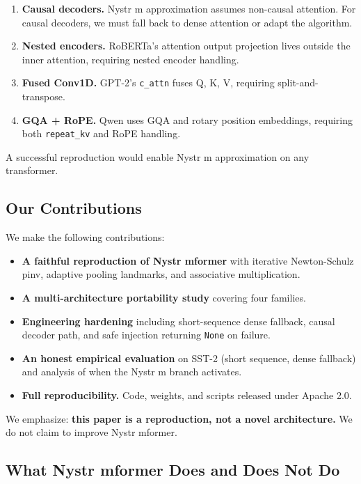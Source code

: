 \begin{enumerate}
\item \textbf{Causal decoders.} Nystr m approximation assumes non-causal attention.
  For causal decoders, we must fall back to dense attention or adapt the
  algorithm.
\item \textbf{Nested encoders.} RoBERTa's attention output projection lives outside
  the inner attention, requiring nested encoder handling.
\item \textbf{Fused Conv1D.} GPT-2's \texttt{c\_attn} fuses Q, K, V, requiring split-and-transpose.
\item \textbf{GQA + RoPE.} Qwen uses GQA and rotary position embeddings, requiring
  both \texttt{repeat\_kv} and RoPE handling.

\end{enumerate}
A successful reproduction would enable Nystr m approximation on any 
transformer.

\subsection{Our Contributions}

We make the following contributions:

\begin{itemize}
\item \textbf{A faithful reproduction of Nystr mformer} with iterative
  Newton-Schulz pinv, adaptive pooling landmarks, and associative
  multiplication.
\item \textbf{A multi-architecture portability study} covering four families.
\item \textbf{Engineering hardening} including short-sequence dense fallback,
  causal decoder path, and safe injection returning \texttt{None} on failure.
\item \textbf{An honest empirical evaluation} on SST-2 (short sequence, dense
  fallback) and analysis of when the Nystr m branch activates.
\item \textbf{Full reproducibility.} Code, weights, and scripts released under
  Apache 2.0.

\end{itemize}
We emphasize: \textbf{this paper is a reproduction, not a novel architecture.} 
We do not claim to improve Nystr mformer.

\subsection{What Nystr mformer Does and Does Not Do}

